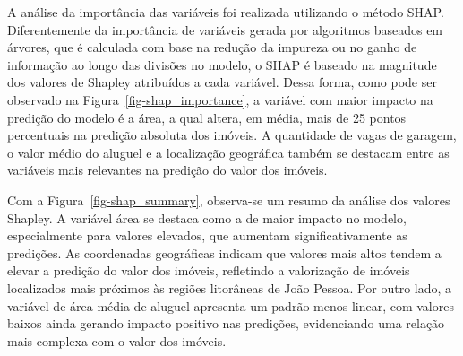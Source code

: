 \documentclass[
  12pt,
  a4paper,
]{scrreprt}
\begin{document}
A análise da importância das variáveis foi realizada utilizando o método
SHAP. Diferentemente da importância de variáveis gerada por algoritmos
baseados em árvores, que é calculada com base na redução da impureza ou
no ganho de informação ao longo das divisões no modelo, o SHAP é baseado
na magnitude dos valores de Shapley atribuídos a cada variável. Dessa
forma, como pode ser observado na Figura~\ref{fig-shap_importance}, a
variável com maior impacto na predição do modelo é a área, a qual
altera, em média, mais de 25 pontos percentuais na predição absoluta dos
imóveis. A quantidade de vagas de garagem, o valor médio do aluguel e a
localização geográfica também se destacam entre as variáveis mais
relevantes na predição do valor dos imóveis.

\vspace{12pt}

Com a Figura~\ref{fig-shap_summary}, observa-se um resumo da análise dos
valores Shapley. A variável área se destaca como a de maior impacto no
modelo, especialmente para valores elevados, que aumentam
significativamente as predições. As coordenadas geográficas indicam que
valores mais altos tendem a elevar a predição do valor dos imóveis,
refletindo a valorização de imóveis localizados mais próximos às regiões
litorâneas de João Pessoa. Por outro lado, a variável de área média de
aluguel apresenta um padrão menos linear, com valores baixos ainda
gerando impacto positivo nas predições, evidenciando uma relação mais
complexa com o valor dos imóveis.
\end{document}
